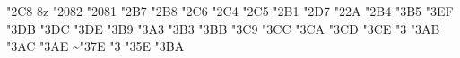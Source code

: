 {  \mathchardef\cup           "2\hex\symbfam C8
  \def\tmpa{8z}\ifx\fotenc\tmpa
    \mathchardef\ddagger     "2082
    \mathchardef\dagger      "2081
  \fi
  \mathchardef\bullet        "2\hex\symbfam B7
  \mathchardef\div           "2\hex\symbfam B8
  \mathchardef\oslash        "2\hex\symbfam C6
  \mathchardef\otimes        "2\hex\symbfam C4
  \mathchardef\oplus         "2\hex\symbfam C5
  \mathchardef\pm            "2\hex\symbfam B1
  \mathchardef\cdot          "2\hex\symbfam D7
  \mathchardef\ast           "2\hex\symbfam 2A
  \mathchardef\times         "2\hex\symbfam B4
  \let\star \ast
  \mathchardef\propto         "3\hex\symbfam B5
  \mathchardef\mid            "3\hex\symbfam EF
  \mathchardef\Leftrightarrow "3\hex\symbfam DB
  \mathchardef\Leftarrow      "3\hex\symbfam DC
  \mathchardef\Rightarrow     "3\hex\symbfam DE
  \mathchardef\neq            "3\hex\symbfam B9 \let\ne \neq
  \mathchardef\leq            "3\hex\symbfam A3 \let\le \leq
  \mathchardef\geq            "3\hex\symbfam B3 \let\ge \geq
  \mathchardef\approx         "3\hex\symbfam BB
  \mathchardef\supset         "3\hex\symbfam C9
  \mathchardef\subset         "3\hex\symbfam CC
  \mathchardef\supseteq       "3\hex\symbfam CA
  \mathchardef\subseteq       "3\hex\symbfam CD
  \mathchardef\in             "3\hex\symbfam CE
  \mathchardef\ni             "3\hex{} \let\owns \ni
  \mathchardef\leftrightarrow "3\hex\symbfam AB
  \mathchardef\leftarrow      "3\hex\symbfam AC \let\gets \leftarrow
  \mathchardef\rightarrow     "3\hex\symbfam AE \let\to \rightarrow
  \mathchardef\sim            "3\hex\symbfam 7E
  \mathchardef\simeq          "3\hex{}
  \mathchardef\perp           "3\hex\symbfam 5E
  \mathchardef\equiv          "3\hex\symbfam BA
  \def\longrightarrow{\mathrel{\smash{\mathchar"200}}\joinrel\mathchar"3221 }%
  \def\longleftarrow{\mathchar"3220\joinrel\mathrel{\smash{\mathchar"200}}}%
  \def\Longrightarrow{\mathrel{\pickmathfont{cmr8z}=}\joinrel\mathchar"3229 }%
  \def\Longleftarrow{\mathchar"3228\joinrel\mathrel{\pickmathfont{cmr8z}=}}%
  \def\mapsto{\mapstochar\mathchar"3221 }%
  \def\longleftrightarrow{\mathchar"3220\joinrel\mathchar"3221 }%
  \def\Longleftrightarrow{\mathchar"3228\joinrel\mathchar"3229 }%
  \def\rightarrowfill{$\mathsurround0pt\smash{\mathchar"200}\mkern-7mu%
     \cleaders\hbox{$\mkern-2mu\smash{\mathchar"200}\mkern-2mu$}\hfill
     \mkern-7mu\mathchar"221$}%
  \def\leftarrowfill{$\mathsurround0pt\mathchar"220\mkern-7mu%
     \cleaders\hbox{$\mkern-2mu\smash{\mathchar"200}\mkern-2mu$}\hfill
     \mkern-7mu\smash{\mathchar"200}$}%
}
